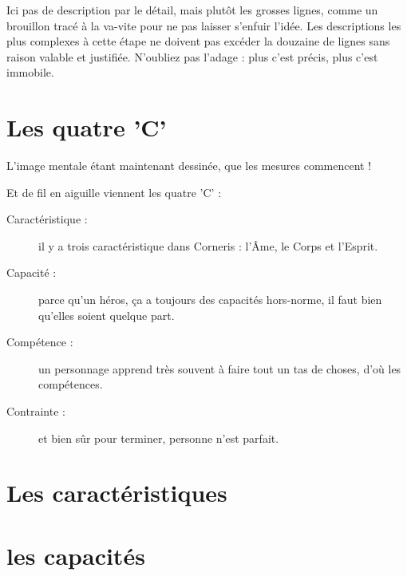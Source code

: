 \documentclass[11pt,oneside]{book}
\begin{document}
\begin{multicols}{2}
        Ici pas de description par le détail, mais plutôt les grosses lignes, comme un brouillon tracé à la va-vite pour ne pas laisser s'enfuir l'idée. Les descriptions les plus complexes à cette étape ne doivent pas excéder la douzaine de lignes sans raison valable et justifiée. N'oubliez pas l'adage : plus c'est précis, plus c'est immobile.

    \section{Les quatre 'C'}

        L'image mentale étant maintenant dessinée, que les mesures commencent !

        Et de fil en aiguille viennent les quatre 'C' :

        \begin{description}
            \item[Caractéristique :] il y a trois caractéristique dans Corneris : l'Âme, le Corps et l'Esprit.
            \item[Capacité :] parce qu'un héros, ça a toujours des capacités hors-norme, il faut bien qu'elles soient quelque part.
            \item[Compétence :] un personnage apprend très souvent à faire tout un tas de choses, d'où les compétences.
            \item[Contrainte :] et bien sûr pour terminer, personne n'est parfait.
        \end{description}

    
    \section{Les caractéristiques}
        


    \section{les capacités}




\end{multicols}
\end{document}
